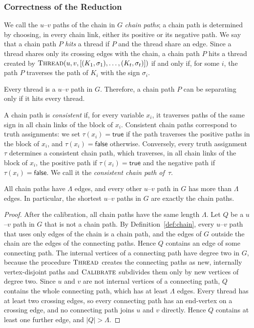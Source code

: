 \subsubsection{Correctness of the Reduction}
\label{sec:reduction-correctness}
We call the $u$--$v$ paths of the chain in $G$ \emph{chain paths}; a chain path is determined by choosing, in every chain link, either its positive or its negative path.
We say that a chain path $P$ \emph{hits} a thread if $P$ and the thread share an edge.
Since a thread shares only its crossing edges with the chain, a chain path $P$ hits a thread created by $\textsc{Thread}(u,v,[(K_1,\sigma_1),\dots,(K_t,\sigma_t)])$ if and only if, for some $i$, the path $P$ traverses the path of $K_i$ with the sign $\sigma_i$.

Every thread is a $u$--$v$ path in $G$.
Therefore, a chain path $P$ can be separating only if it hits every thread.

A chain path is \emph{consistent} if, for every variable $x_i$, it traverses paths of the same sign in all chain links of the block of $x_i$.
Consistent chain paths correspond to truth assignments: we set $\tau(x_i)=\mathsf{true}$ if the path traverses the positive paths in the block of $x_i$, and $\tau(x_i)=\mathsf{false}$ otherwise.
Conversely, every truth assignment $\tau$ determines a consistent chain path, which traverses, in all chain links of the block of $x_i$, the positive path if $\tau(x_i)=\mathsf{true}$ and the negative path if $\tau(x_i)=\mathsf{false}$.
We call it the \emph{consistent chain path of~$\tau$}.

\begin{lemma}
\label{lem:chain-paths}
All chain paths have $\Lambda$ edges, and every other $u$--$v$ path in $G$ has more than $\Lambda$ edges.
In particular, the shortest $u$--$v$ paths in $G$ are exactly the chain paths.
\end{lemma}

\begin{proof}
After the calibration, all chain paths have the same length $\Lambda$.
Let $Q$ be a $u$--$v$ path in $G$ that is not a chain path.
By Definition~\ref{def:chain}, every $u$--$v$ path that uses only edges of the chain is a chain path, and the edges of $G$ outside the chain are the edges of the connecting paths.
Hence $Q$ contains an edge of some connecting path.
The internal vertices of a connecting path have degree two in $G$, because the procedure $\textsc{Thread}$ creates the connecting paths as new, internally vertex-disjoint paths and $\textsc{Calibrate}$ subdivides them only by new vertices of degree two.
Since $u$ and $v$ are not internal vertices of a connecting path, $Q$ contains the whole connecting path, which has at least $\Lambda$ edges.
Every thread has at least two crossing edges, so every connecting path has an end-vertex on a crossing edge, and no connecting path joins $u$ and $v$ directly.
Hence $Q$ contains at least one further edge, and $|Q| > \Lambda$.
\end{proof}

